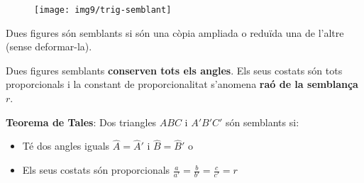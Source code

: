 \begin{theorybox}
	\begin{figure}
		\centering
			\texttt{[image: img9/trig-semblant]}
	\end{figure}
	
	Dues figures són semblants si són una còpia ampliada o reduïda una de l'altre (sense deformar-la). 
	
	Dues figures semblants \textbf{conserven tots els angles}. Els seus costats són tots proporcionals i la constant de proporcionalitat s'anomena \textbf{raó de la semblança} $r$.
	
	\textbf{Teorema de Tales}: Dos triangles $ABC$ i $A'B'C'$ són semblants si: 
	
	\begin{itemize}
		\item Té dos angles iguals $\hat A = \hat A'$  i $\hat B = \hat B'$ o
		\item Els seus costats són proporcionals $\frac{a}{a'}=\frac{b}{b'}=\frac{c}{c'}=r$
	\end{itemize}
	

\end{theorybox}

